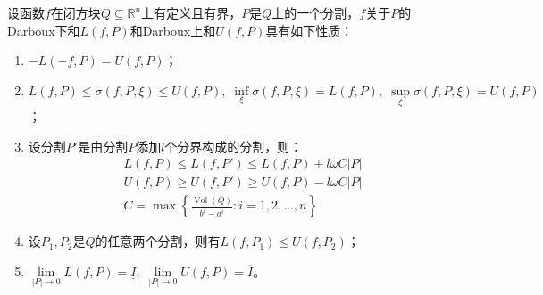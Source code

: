 \begin{property}\label{prop:DarbouxSum}
	设函数$f$在闭方块$Q\subseteq\mathbb{R}^n$上有定义且有界，$P$是$Q$上的一个分割，$f$关于$P$的Darboux下和$L(f,P)$和Darboux上和$U(f,P)$具有如下性质：
	\begin{enumerate}
		\item $-L(-f,P)=U(f,P)$；
		\item $L(f,P)\leqslant\sigma(f,P,\xi)\leqslant U(f,P),\;\inf\limits_{\xi}\sigma(f,P,\xi)=L(f,P),\;\sup\limits_{\xi}\sigma(f,P,\xi)=U(f,P)$；
		\item 设分割$P'$是由分割$P$添加$l$个分界构成的分割，则：
		\begin{align*}
			L(f,P)\leqslant L(f,P')\leqslant L(f,P)+l\omega C|P| \\
			U(f,P)\geqslant U(f,P')\geqslant U(f,P)-l\omega C|P| \\
			C=\max\left\{\frac{\operatorname{Vol}(Q)}{b^i-a^i}:i=1,2,\dots,n\right\}
		\end{align*}
		\item 设$P_1,P_2$是$Q$的任意两个分割，则有$L(f,P_1)\leqslant U(f,P_2)$；
		\item $\lim\limits_{|P|\to0}L(f,P)=\underline{I},\;\lim\limits_{|P|\to0}U(f,P)=\overline{I}$。
	\end{enumerate}
\end{property}
